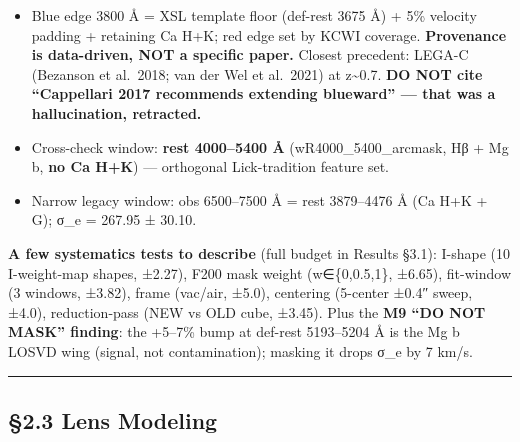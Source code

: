 \documentclass[
]{article}
\providecommand{\tightlist}{%
  \setlength{\itemsep}{0pt}\setlength{\parskip}{0pt}}
\newcommand{\BreakablePath}[1]{{\ttfamily\sloppy #1}}
\begin{document}
\begin{itemize}
  \begin{itemize}
  \tightlist
  \item
    Blue edge 3800 Å = XSL template floor (def-rest 3675 Å) + 5\%
    velocity padding + retaining Ca H+K; red edge set by KCWI coverage.
    \textbf{Provenance is data-driven, NOT a specific paper.} Closest
    precedent: LEGA-C (Bezanson et al.~2018; van der Wel et al.~2021) at
    z\textasciitilde0.7. \textbf{DO NOT cite ``Cappellari 2017
    recommends extending blueward'' --- that was a hallucination,
    retracted.}
  \item
    Cross-check window: \textbf{rest 4000--5400 Å}
    (\BreakablePath{wR4000\_\discretionary{}{}{}5400\_\discretionary{}{}{}arcmask},
    Hβ + Mg b, \textbf{no Ca H+K}) --- orthogonal Lick-tradition feature
    set.
  \item
    Narrow legacy window: obs 6500--7500 Å = rest 3879--4476 Å (Ca H+K +
    G); σ\_e = 267.95 ± 30.10.
  \end{itemize}
\end{itemize}

\textbf{A few systematics tests to describe} (full budget in Results
§3.1): I-shape (10 I-weight-map shapes, ±2.27), F200 mask weight
(w∈\{0,0.5,1\}, ±6.65), fit-window (3 windows, ±3.82), frame (vac/air,
±5.0), centering (5-center ±0.4″ sweep, ±4.0), reduction-pass (NEW vs
OLD cube, ±3.45). Plus the \textbf{M9 ``DO NOT MASK'' finding}: the
+5--7\% bump at def-rest 5193--5204 Å is the Mg b LOSVD wing (signal,
not contamination); masking it drops σ\_e by 7 km/s.

\begin{center}\rule{0.5\linewidth}{0.5pt}\end{center}

\hypertarget{lens-modeling}{%
\subsection{§2.3 Lens Modeling}\label{lens-modeling}}
\end{document}
